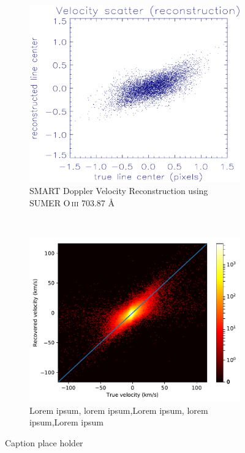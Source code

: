 \documentclass[10pt,letterpaper]{article}
\begin{document}
				\begin{figure}[t!]
					\centering
					\begin{subfigure}[t]{0.5\textwidth}
						\centering
						\includegraphics[width=\textwidth]{fig/smart_hist}
						\caption{SMART Doppler Velocity Reconstruction using SUMER O\,\textsc{iii} 703.87 \AA}
					\end{subfigure}%
					~ 
					\begin{subfigure}[t]{0.5\textwidth}
						\centering
						\includegraphics[width=\textwidth]{fig/minnd_hist}
						\caption{Lorem ipsum, lorem ipsum,Lorem ipsum, lorem ipsum,Lorem ipsum}
					\end{subfigure}
					\caption{Caption place holder}
				\end{figure}
				
\end{document}
